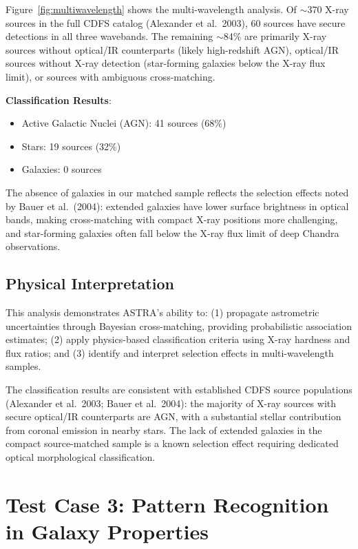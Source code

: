 \documentclass[usenatbib]{rasti}
\begin{document}
Figure~\ref{fig:multiwavelength} shows the multi-wavelength analysis. Of $\sim$370 X-ray sources in the full CDFS catalog (Alexander et al.~2003)\cite{alexander2003}, 60 sources have secure detections in all three wavebands. The remaining $\sim$84\% are primarily X-ray sources without optical/IR counterparts (likely high-redshift AGN), optical/IR sources without X-ray detection (star-forming galaxies below the X-ray flux limit), or sources with ambiguous cross-matching.

\textbf{Classification Results}:
\begin{itemize}
\item Active Galactic Nuclei (AGN): 41 sources (68\%)
\item Stars: 19 sources (32\%)
\item Galaxies: 0 sources
\end{itemize}

The absence of galaxies in our matched sample reflects the selection effects noted by Bauer et al.~(2004)\cite{bauer2004}: extended galaxies have lower surface brightness in optical bands, making cross-matching with compact X-ray positions more challenging, and star-forming galaxies often fall below the X-ray flux limit of deep Chandra observations.

\subsection{Physical Interpretation}

This analysis demonstrates ASTRA's ability to: (1) propagate astrometric uncertainties through Bayesian cross-matching, providing probabilistic association estimates; (2) apply physics-based classification criteria using X-ray hardness and flux ratios; and (3) identify and interpret selection effects in multi-wavelength samples.

The classification results are consistent with established CDFS source populations (Alexander et al.~2003; Bauer et al.~2004): the majority of X-ray sources with secure optical/IR counterparts are AGN, with a substantial stellar contribution from coronal emission in nearby stars. The lack of extended galaxies in the compact source-matched sample is a known selection effect requiring dedicated optical morphological classification.

\section{Test Case 3: Pattern Recognition in Galaxy Properties}
\end{document}
